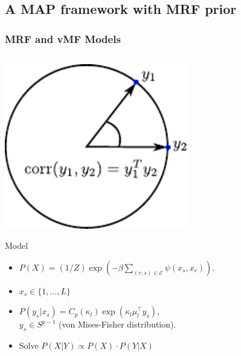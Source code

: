 \documentclass[sansserif, 10pt]{beamer}
\begin{document}
\subsection{A MAP framework with MRF prior}
\begin{frame}
\frametitle{MRF and vMF Models}

\begin{columns}
  \begin{column}{0.6\textwidth}
    \centering
    \includegraphics[width=0.6\textwidth]{sfig/vmf}

      \begin{block}{Model}
        \begin{itemize}
        \item  $P(X) = (1/Z) \exp \left ( -\beta \sum_{(r,s)\in \mathcal{E}} \psi(x_s, x_r)\right )$.
          \item $x_s \in \{1, \dots, L\}$
        \item  $P(y_s | x_s) = C_p(\kappa_l) \exp (\kappa_l \mu_l^{\top} y_s)$, \\
          $y_s \in S^{p-1}$ (von Mises-Fisher distribution).
        \item Solve $P(X | Y) \propto P(X) \cdot P(Y|X) $
        \end{itemize}
      \end{block}
      \end{column}


\end{columns}
\end{frame}
\end{document}
